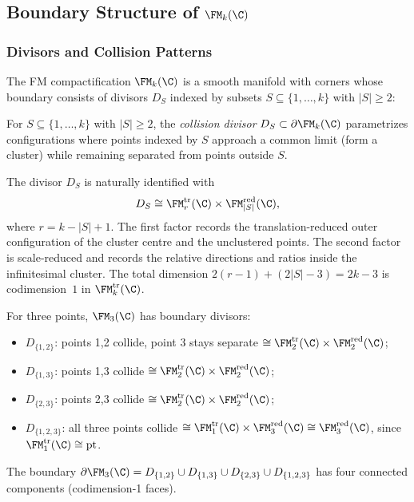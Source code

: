 \subsection{\texorpdfstring{Boundary Structure of $\FM_k(\C)$}{Boundary Structure of FM k(C)}}

\subsubsection{Divisors and Collision Patterns}

The FM compactification $\FM_k(\C)$ is a smooth manifold with corners whose boundary consists of divisors $D_S$ indexed by subsets $S \subseteq \{1,\ldots,k\}$ with $|S| \geq 2$:

\begin{definition}
\label{def:boundary_divisors}
For $S \subseteq \{1,\ldots,k\}$ with $|S| \geq 2$, the \emph{collision divisor} $D_S \subset \partial \FM_k(\C)$ parametrizes configurations where points indexed by $S$ approach a common limit (form a cluster) while remaining separated from points outside $S$.

The divisor $D_S$ is naturally identified with
\[
D_S \cong \FM_r^{\mathrm{tr}}(\C) \times
\FM_{|S|}^{\mathrm{red}}(\C),
\]
where \(r = k - |S| + 1\).  The first factor records the
translation-reduced outer configuration of the cluster centre and the
unclustered points.  The second factor is scale-reduced and records the
relative directions and ratios inside the infinitesimal cluster.  The
total dimension \(2(r-1)+(2|S|-3)=2k-3\) is codimension~\(1\) in
\(\FM_k^{\mathrm{tr}}(\C)\).
\end{definition}

\begin{example}[$k=3$]
For three points, $\FM_3(\C)$ has boundary divisors:
\begin{itemize}
\item $D_{\{1,2\}}$: points 1,2 collide, point 3 stays separate
\(\cong \FM_2^{\mathrm{tr}}(\C)\times\FM_2^{\mathrm{red}}(\C)\);
\item $D_{\{1,3\}}$: points 1,3 collide
\(\cong \FM_2^{\mathrm{tr}}(\C)\times\FM_2^{\mathrm{red}}(\C)\);
\item $D_{\{2,3\}}$: points 2,3 collide
\(\cong \FM_2^{\mathrm{tr}}(\C)\times\FM_2^{\mathrm{red}}(\C)\);
\item $D_{\{1,2,3\}}$: all three points collide
\(\cong \FM_1^{\mathrm{tr}}(\C)\times\FM_3^{\mathrm{red}}(\C)
\cong \FM_3^{\mathrm{red}}(\C)\), since
\(\FM_1^{\mathrm{tr}}(\C)\cong \mathrm{pt}\).
\end{itemize}
The boundary $\partial \FM_3(\C) = D_{\{1,2\}} \cup D_{\{1,3\}} \cup D_{\{2,3\}} \cup D_{\{1,2,3\}}$ has four connected components (codimension-1 faces).
\end{example}

